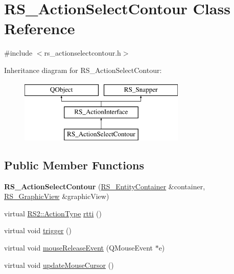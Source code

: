 \hypertarget{classRS__ActionSelectContour}{\section{R\-S\-\_\-\-Action\-Select\-Contour Class Reference}
\label{classRS__ActionSelectContour}
}


{\ttfamily \#include $<$rs\-\_\-actionselectcontour.\-h$>$}

Inheritance diagram for R\-S\-\_\-\-Action\-Select\-Contour\-:\begin{figure}[H]
\begin{center}
\leavevmode
\includegraphics[height=3.000000cm]{classRS__ActionSelectContour}
\end{center}
\end{figure}
\subsection*{Public Member Functions}
\begin{DoxyCompactItemize}
\item 
\hypertarget{classRS__ActionSelectContour_aa3c6d7c05b686e62c553f99535ef19c0}{{\bfseries R\-S\-\_\-\-Action\-Select\-Contour} (\hyperlink{classRS__EntityContainer}{R\-S\-\_\-\-Entity\-Container} \&container, \hyperlink{classRS__GraphicView}{R\-S\-\_\-\-Graphic\-View} \&graphic\-View)}\label{classRS__ActionSelectContour_aa3c6d7c05b686e62c553f99535ef19c0}

\item 
virtual \hyperlink{classRS2_afe3523e0bc41fd637b892321cfc4b9d7}{R\-S2\-::\-Action\-Type} \hyperlink{classRS__ActionSelectContour_a630555f16a1cd4d0b03ccccb8265f280}{rtti} ()
\item 
virtual void \hyperlink{classRS__ActionSelectContour_a12a9384c1438efd3a12c6ea38b8271b3}{trigger} ()
\item 
virtual void \hyperlink{classRS__ActionSelectContour_a895911cf44735a4d50dacd9431c582ce}{mouse\-Release\-Event} (Q\-Mouse\-Event $\ast$e)
\item 
virtual void \hyperlink{classRS__ActionSelectContour_a1291c5a3530a4bce58807b05d89d500c}{update\-Mouse\-Cursor} ()
\end{DoxyCompactItemize}
